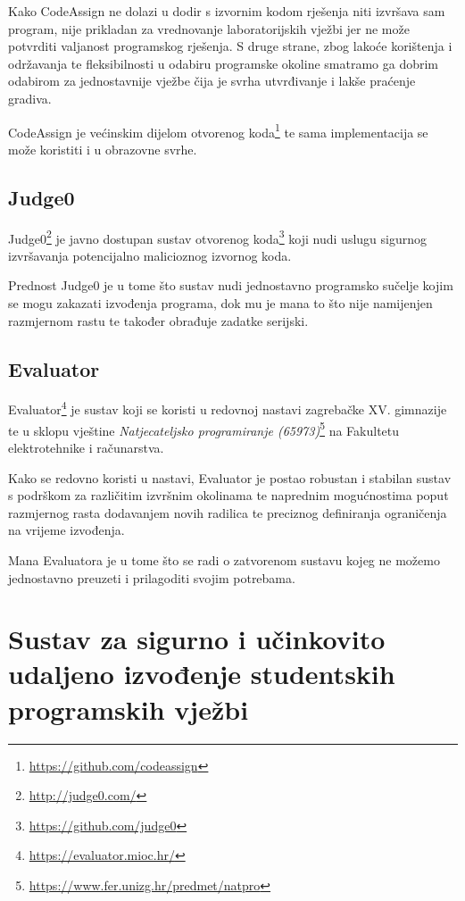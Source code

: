 \documentclass[times, utf8, zavrsni]{fer}
\begin{document}
Kako CodeAssign ne dolazi u dodir s izvornim kodom rješenja niti izvršava sam program, nije prikladan za vrednovanje laboratorijskih vježbi jer ne može potvrditi valjanost programskog rješenja. S druge strane, zbog lakoće korištenja i održavanja te fleksibilnosti u odabiru programske okoline smatramo ga dobrim odabirom za jednostavnije vježbe čija je svrha utvrđivanje i lakše praćenje gradiva.

CodeAssign je većinskim dijelom otvorenog koda{\footnote{\url{https://github.com/codeassign}}} te sama implementacija se može koristiti i u obrazovne svrhe.

\section{Judge0}

Judge0{\footnote{\url{http://judge0.com/}}} je javno dostupan sustav otvorenog koda{\footnote{\url{https://github.com/judge0}}} koji nudi uslugu sigurnog izvršavanja potencijalno malicioznog izvornog koda.

Prednost Judge0 je u tome što sustav nudi jednostavno programsko sučelje kojim se mogu zakazati izvođenja programa, dok mu je mana to što nije namijenjen razmjernom rastu te također obrađuje zadatke serijski. 

\section{Evaluator}

Evaluator{\footnote{\url{https://evaluator.mioc.hr/}}} je sustav koji se koristi u redovnoj nastavi zagrebačke XV. gimnazije te u sklopu vještine {\textit{Natjecateljsko programiranje (65973)}}{\footnote{\url{https://www.fer.unizg.hr/predmet/natpro}}} na Fakultetu elektrotehnike i računarstva.

Kako se redovno koristi u nastavi, Evaluator je postao robustan i stabilan sustav s podrškom za različitim izvršnim okolinama te naprednim mogućnostima poput razmjernog rasta dodavanjem novih radilica te preciznog definiranja ograničenja na vrijeme izvođenja.

Mana Evaluatora je u tome što se radi o zatvorenom sustavu kojeg ne možemo jednostavno preuzeti i prilagoditi svojim potrebama.

\chapter{Sustav za sigurno i učinkovito udaljeno izvođenje studentskih programskih vježbi}
\end{document}
